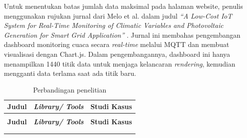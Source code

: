Untuk menentukan batas jumlah data maksimal pada halaman website, penulis menggunakan rujukan jurnal dari Melo et al. dalam judul \textit{“A Low-Cost IoT System for Real-Time Monitoring of Climatic Variables and Photovoltaic Generation for Smart Grid Application”} \cite{Melo2021}. Jurnal ini membahas pengembangan dashboard monitoring cuaca secara \textit{real-time} melalui MQTT dan membuat visualisasi dengan Chart.js. Dalam pengembangannya, dashboard ini hanya menampilkan 1440 titik data untuk menjaga kelancaran \textit{rendering}, kemudian mengganti data terlama saat ada titik baru. 

\begin{longtable}{|p{}|
		p{}|
		p{}|}
	\caption{Perbandingan penelitian} \label{t_risetPemodelan} \\
	\hline
	\textbf{Judul} & \textbf{\textit{Library/ Tools }} & \textbf{Studi Kasus} \\ \hline
	\endfirsthead
	
	\multicolumn{3}{c}{} \\ \hline
	\textbf{Judul} & \textbf{\textit{Library/ Tools }} & \textbf{Studi Kasus} \\ \hline
	\endhead
	
	\hline \multicolumn{3}{r}{ } \\ 
	\endfoot
	
	\hline
	\endlastfoot
	

\end{longtable}
